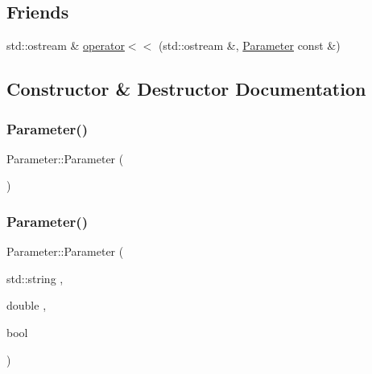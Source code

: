 \subsection*{Friends}
\begin{DoxyCompactItemize}
\item 
std\+::ostream \& \mbox{\hyperlink{class_parameter_a062fa105b64c362071304bc5f2eb350a}{operator$<$$<$}} (std\+::ostream \&, \mbox{\hyperlink{class_parameter}{Parameter}} const \&)
\end{DoxyCompactItemize}


\subsection{Constructor \& Destructor Documentation}
\mbox{\label{class_parameter_a5ba93ca36c3261d3850e67f92717c2f5}} 
\subsubsection{\texorpdfstring{Parameter()}{Parameter()}\hspace{0.1cm}{\footnotesize\ttfamily [1/3]}}
{\footnotesize\ttfamily Parameter\+::\+Parameter (\begin{DoxyParamCaption}{ }\end{DoxyParamCaption})}

\mbox{\label{class_parameter_a0a13c1589f500cceea00532061e37815}} 
\subsubsection{\texorpdfstring{Parameter()}{Parameter()}\hspace{0.1cm}{\footnotesize\ttfamily [2/3]}}
{\footnotesize\ttfamily Parameter\+::\+Parameter (\begin{DoxyParamCaption}\item[{std\+::string}]{,  }\item[{double}]{,  }\item[{bool}]{ }\end{DoxyParamCaption})}

\mbox{\label{class_parameter_ad3f5d861da24673d97bd1bd206b0b89a}} 
